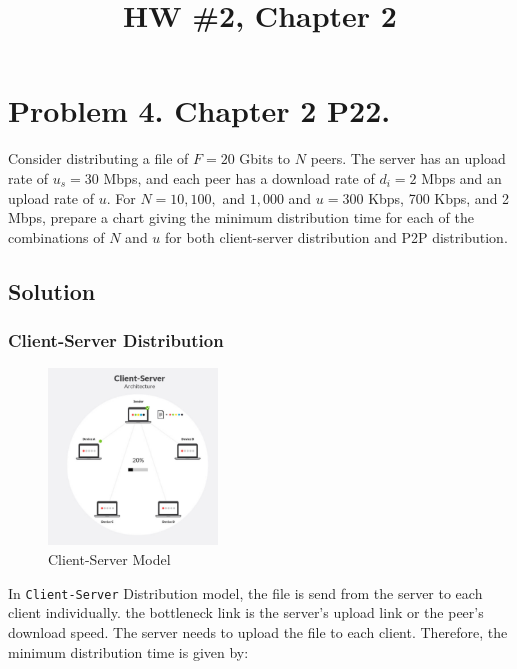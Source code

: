 \documentclass{cshwk}
\begin{document}
\title{HW \#2, Chapter 2}

\maketitle

\section*{Problem 4. Chapter 2 P22.}


Consider distributing a file of \( F = 20 \) Gbits to \( N \) peers. The server has an upload rate of \( u_s = 30 \) Mbps, and each peer has a download rate of \( d_i = 2 \) Mbps and an upload rate of \( u \). For \( N = 10, 100, \) and \( 1,000 \) and \( u = 300 \) Kbps, 700 Kbps, and 2 Mbps, prepare a chart giving the minimum distribution time for each of the combinations of \( N \) and \( u \) for both client-server distribution and P2P distribution.

\subsection*{Solution}



\subsubsection*{Client-Server Distribution}

\begin{figure}[H]
    \centering
    \includegraphics[width=0.4\textwidth]{hw2-4-1.png}
    \caption{Client-Server Model}
    \label{fig:cs}
\end{figure}
In \texttt{Client-Server} Distribution model, the file is send from the server to each client individually. the bottleneck link is the server's upload link or the peer's download speed. The server needs to upload the file to each client. Therefore, the minimum distribution time is given by:
\end{document}
